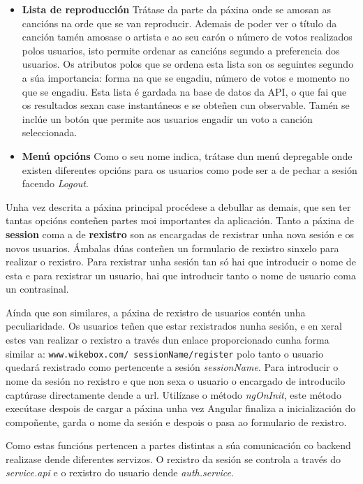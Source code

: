 \begin{itemize}
	\item \textbf{Lista de reproducción}\smallbreak
		Trátase da parte da páxina onde se amosan as cancións na orde que se van reproducir. Ademais de poder ver o título da canción tamén amosase o artista e ao seu carón o número de votos realizados polos usuarios, isto permite ordenar as cancións segundo a preferencia dos usuarios. Os atributos polos que se ordena esta lista son os seguintes segundo a súa importancia: forma na que se engadiu, número de votos e momento no que se engadiu. Esta lista é gardada na base de datos da API, o que fai que os resultados sexan case instantáneos e se obteñen cun observable. Tamén se inclúe un botón que permite aos usuarios engadir un voto a canción seleccionada.

	\item \textbf{Menú opcións}\smallbreak
		Como o seu nome indica, trátase dun menú depregable onde existen diferentes opcións para os usuarios como pode ser a de pechar a sesión facendo \textit{Logout}.
\end{itemize}

Unha vez descrita a páxina principal procédese a debullar as demais, que sen ter tantas opcións conteñen partes moi importantes da aplicación. Tanto a páxina de \textbf{session} coma a de \textbf{rexistro} son as encargadas de rexistrar unha nova sesión e os novos usuarios. Ámbalas dúas conteñen un formulario de rexistro sinxelo para realizar o rexistro. Para rexistrar unha sesión tan só hai que introducir o nome de esta e para rexistrar un usuario, hai que introducir tanto o nome de usuario coma un contrasinal.

Aínda que son similares, a páxina de rexistro de usuarios contén unha peculiaridade. Os usuarios teñen que estar rexistrados nunha sesión, e en xeral estes van realizar o rexistro a través dun enlace proporcionado cunha forma similar a: \lstinline{www.wikebox.com/ sessionName/register} polo tanto o usuario quedará rexistrado como pertencente a sesión \textit{sessionName}. Para introducir o nome da sesión no rexistro e que non sexa o usuario o encargado de introducilo captúrase directamente dende a url. Utilízase o método \textit{ngOnInit}, este método execútase despois de cargar a páxina unha vez Angular finaliza a inicialización do compoñente, garda o nome da sesión e despois o pasa ao formulario de rexistro.

Como estas funcións pertencen a partes distintas a súa comunicación co backend realizase dende diferentes servizos. O rexistro da sesión se controla a través do \textit{service.api} e o rexistro do usuario dende \textit{auth.service}.


